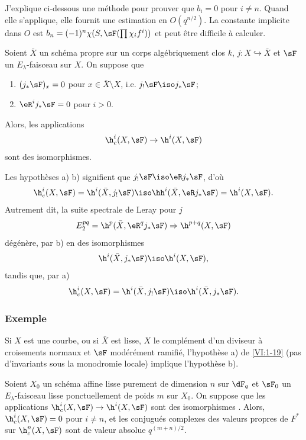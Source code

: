 J'explique ci-dessous une méthode pour prouver que $b_i=0$ pour $i\ne n$. 
Quand elle s'applique, elle fournit une estimation en $O(q^{n/2})$. La constante 
implicite dans $O$ est $b_n=(-1)^n \chi(S,\sF(\prod \chi_i f^i))$ et peut 
être difficile à calculer. 





\begin{proposition_}\label{VI:1-19}
Soient $\bar X$ un schéma propre sur un corps alg\'ebriquement clos $k$, 
$j:X\hookrightarrow \bar X$  et $\sF$ un $E_\lambda$-faisceau 
sur $X$. On suppose que 
\begin{enumerate}[\indent a)]
  \item $(j_\ast\sF)_x = 0$ pour $x\in \bar X\setminus X$, i.e. 
    $j_!\sF\iso j_\ast\sF$; 
  \item $\eR^i j_\ast \sF = 0$ pour $i>0$.
\end{enumerate}
Alors, les applications 
\[
  \h_c^i(X,\sF) \to \h^i(X,\sF)
\]
sont des isomorphismes. 
\end{proposition_}

Les hypothèses a) b) signifient que $j_! \sF \iso \eR j_\ast \sF$, d'où 
\[
  \h_c^i(X,\sF) = \h^i(\bar X,j_!\sF) \iso \hh^i(\bar X,\eR j_\ast \sF) = \h^i(X,\sF) \text{.}
\]
Autrement dit, la suite spectrale de Leray pour $j$ 
\[
  E_2^{pq} = \h^p(\bar X,\eR^q j_\ast \sF) \Rightarrow \h^{p+q}(X,\sF) 
\]
dégénère, par b) en des isomorphismes 
\[
  \h^i(\bar X,j_\ast\sF) \iso \h^i(X,\sF) \text{,}
\]
tandis que, par a) 
\[
  \h_c^i(X,\sF) = \h^i(\bar X,j_!\sF) \iso \h^i(\bar X,j_\ast\sF) \text{.}
\]





\subsubsection{Exemple}\label{VI:1-19-1}

Si $X$ est une courbe, ou si $\bar X$ est lisse, $X$ le complément d'un 
diviseur à croisements normaux et $\sF$ modérément ramifié, 
l'hypothèse a) de \ref{VI:1-19} (pas d'invariants sous la monodromie locale) 
implique l'hypothèse b). 





\begin{proposition_}\label{VI:1-20}
Soient $X_0$ un schéma affine lisse purement de dimension $n$ sur $\dF_q$ et 
$\sF_0$ un $E_\lambda$-faisceau lisse ponctuellement de poids $m$ sur $X_0$. On 
suppose que les applications $\h_c^i(X,\sF) \to \h^i(X,\sF)$ sont des 
isomorphismes . Alors, $\h_c^i(X,\sF) = 0$ pour $i\ne n$, et 
les conjugués complexes des valeurs propres de $F^\ast$ sur $\h_c^n(X,\sF)$ 
sont de valeur absolue $q^{(m+n)/2}$. 
\end{proposition_}

